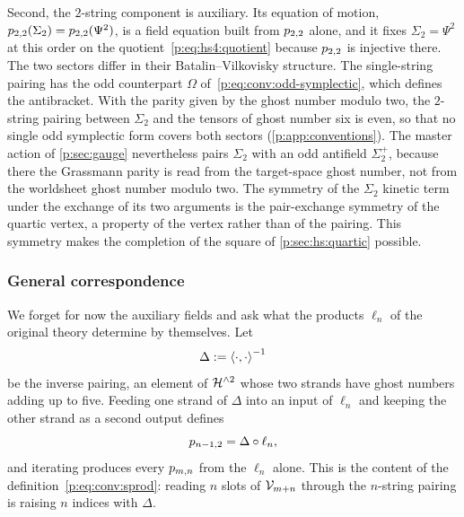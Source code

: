 Second, the $2$-string component is auxiliary.
Its equation of motion, $p_{2,2}(\Sigma_2) = p_{2,2}(\Psi^2)$, is a field equation built from $p_{2,2}$ alone, and it fixes $\Sigma_2 = \Psi^2$ at this order on the quotient~\eqref{p:eq:hs4:quotient} because $p_{2,2}$ is injective there.
The two sectors differ in their Batalin--Vilkovisky structure.
The single-string pairing has the odd counterpart $\Omega$ of~\eqref{p:eq:conv:odd-symplectic}, which defines the antibracket.
With the parity given by the ghost number modulo two, the $2$-string pairing between $\Sigma_2$ and the tensors of ghost number six is even, so that no single odd symplectic form covers both sectors (\cref{p:app:conventions}).
  The master action of \cref{p:sec:gauge} nevertheless pairs $\Sigma_2$ with an odd antifield $\Sigma_2^+$, because there the Grassmann parity is read from the target-space ghost number, not from the worldsheet ghost number modulo two.
The symmetry of the $\Sigma_2$ kinetic term under the exchange of its two arguments is the pair-exchange symmetry of the quartic vertex, a property of the vertex rather than of the pairing.
This symmetry makes the completion of the square of \cref{p:sec:hs:quartic} possible.

\subsubsection{General correspondence}
\label{p:sec:ibl:general}

We forget for now the auxiliary fields and ask what the products $\ell_n$ of the original theory determine by themselves.
Let
\begin{equation}
  \label{p:eq:ibl:inverse-pairing}
  \Delta
    := \braket{\cdot, \cdot}_{}^{-1}
\end{equation}
be the inverse pairing, an element of $\mathcal{H}^{\wedge 2}$ whose two strands have ghost numbers adding up to five.
Feeding one strand of $\Delta$ into an input of $\ell_n$ and keeping the other strand as a second output defines
\begin{equation}
  \label{p:eq:ibl:raising}
  p_{n-1,2}
    = \Delta \circ \ell_n,
\end{equation}
and iterating produces every $p_{m,n}$ from the $\ell_n$ alone.
This is the content of the definition~\eqref{p:eq:conv:sprod}: reading $n$ slots of $\mathcal{V}_{m+n}$ through the $n$-string pairing is raising $n$ indices with $\Delta$.

